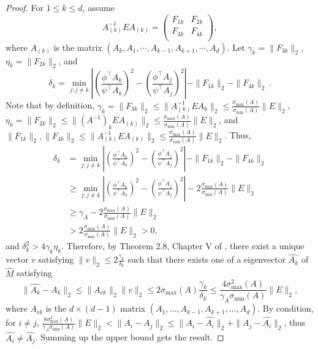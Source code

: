 \begin{proof}
For $1\le k\le d$, assume 
\[
A_{(k)}^{-1} E A_{(k)} =  
\left(
\begin{array}{cc}
F_{1k} & F_{2k}\\
F_{3k} & F_{4k} \\
\end{array} 
\right), 
\]
where $A_{(k)}$ is the matrix $(A_k, A_1, \cdots, A_{k-1}, A_{k+1}, \cdots, A_d)$.
Let $\gamma_k = \|F_{3k}\|_2$, $\eta_k = \|F_{2k}\|_2$, and 
\[
\delta_k = \min_{j: j\neq k} 
\left\vert \left(\frac{\phi^{\top}A_k}{\psi^{\top}A_k}\right)^2 -\left( \frac{\phi^{\top}A_j}{\psi^{\top}A_j}\right)^2 \right\vert - \|F_{1k}\|_2 - \|F_{4k}\|_2\,.
\]
Note that by definition, $\gamma_k = \|F_{3k}\|_2\le\|A_{(k)}^{-1}EA_{k}\|_2\le\frac{\sigma_{\max}(A)}{\sigma_{\min}(A)}\|E\|_2$,
 $\eta_k = \|F_{2k}\|_2\le\|(A^{-1})_kEA_{(k)}\|_2\le\frac{\sigma_{\max}(A)}{\sigma_{\min}(A)}\|E\|_2$, 
 and $\|F_{1k}\|_2,\|F_{4k}\|_2\le\|A_{(k)}^{-1} E A_{(k)}\|_2\le\frac{\sigma_{\max}(A)}{\sigma_{\min}(A)}\|E\|_2$. 
 Thus,
\begin{align*}
\delta_k & = \min_{j:j\neq k} 
	\left\vert \left(\frac{\phi^{\top}A_k}{\psi^{\top}A_k}\right)^2 - \left(\frac{\phi^{\top}A_j}{\psi^{\top}A_j}\right)^2 \right\vert - \|F_{1k}\|_2 - \|F_{4k}\|_2\\
	& \ge \min_{j:j\neq k} \left\vert \left(\frac{\phi^{\top}A_k}{\psi^{\top}A_k}\right)^2 - \left(\frac{\phi^{\top}A_j}{\psi^{\top}A_j}\right)^2 \right\vert - 2 \frac{\sigma_{\max}(A)}{\sigma_{\min}(A)}\|E\|_2\\
	& \ge  \gamma_A -  2 \frac{\sigma_{\max}(A)}{\sigma_{\min}(A)}\|E\|_2 \\
	& >  2 \frac{\sigma_{\max}(A)}{\sigma_{\min}(A)}\|E\|_2 >0,
\end{align*}
and $\delta_k^2 > 4\gamma_k\eta_k$. 
Therefore, by Theorem 2.8, Chapter V of \citep{stewart1990matrix}, there exist a unique vector $v$ satisfying $\|v\|_2\le 2\frac{\gamma_k}{\delta_k}$ such that there exists one of a eigenvector $\hat{A_k}$ of $\hat{M}$ satisfying
 \[
 \|\hat{A_k} - A_k\|_2 \le \|A_{ck}\|_2 \|v\|_2 \le 2\sigma_{\max}(A)\frac{\gamma_k}{\delta_k}
 \le 
 \frac{4\sigma_{\max}^2(A)}{\gamma_A \sigma_{\min}(A) } \|E\|_2,
 \]
 where $A_{ck}$ is the $d\times (d-1)$ matrix $(A_1,\ldots,A_{k-1}, A_{k+1},\ldots,A_d)$.
 By condition, for $i\neq j$,  $\frac{8\sigma_{\max}^2(A)}{\gamma_A \sigma_{\min}(A) } \|E\|_2 < \|A_i - A_j\|_2\le \|A_i - \hat{A_i}\|_2 + \|A_j - \hat{A_i}\|_2$, thus $\hat{A_i} \neq \hat{A_j}$.  Summing up the upper bound gets the result. 
\end{proof}
